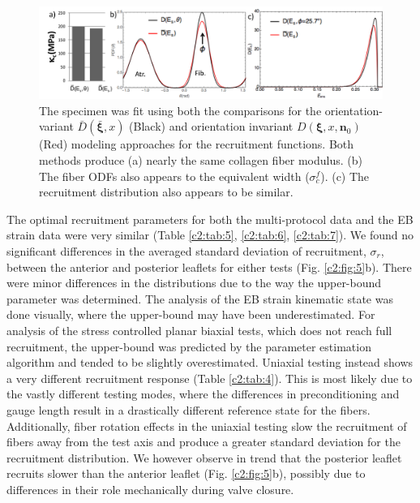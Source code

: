     
\begin{figure}
\centering
\includegraphics[width=\textwidth]{Images/chapter2/figure6.pdf}
\caption{The specimen was fit using both the comparisons for the orientation-variant $\bar{D}(\bar{\mathbf{\xi}},x)$ (Black) and orientation invariant $D(\mathbf{\xi},x,\mathbf{n}_0)$ (Red) modeling approaches for the recruitment functions. Both methods produce (a) nearly the same collagen fiber modulus. (b) The fiber ODFs also appears to the equivalent width ($\sigma_c^f$). (c) The recruitment distribution also appears to be similar.}
\label{c2:fig:6}
\end{figure}
    
    
    The optimal recruitment parameters for both the multi-protocol data and the EB strain data were very similar (Table \ref{c2:tab:5}, \ref{c2:tab:6}, \ref{c2:tab:7}). We found no significant differences in the averaged standard deviation of recruitment, $\sigma_r$, between the anterior and posterior leaflets for either tests (Fig. \ref{c2:fig:5}b). There were minor differences in the distributions due to the way the upper-bound parameter was determined. The analysis of the EB strain kinematic state was done visually, where the upper-bound may have been underestimated. For analysis of the stress controlled planar biaxial tests, which does not reach full recruitment, the upper-bound was predicted by the parameter estimation algorithm and tended to be slightly overestimated. Uniaxial testing instead shows a very different recruitment response (Table \ref{c2:tab:4}). This is most likely due to the vastly different testing modes, where the differences in preconditioning and gauge length result in a drastically different reference state for the fibers. Additionally, fiber rotation effects in the uniaxial testing slow the recruitment of fibers away from the test axis and produce a greater standard deviation for the recruitment distribution. We however observe in trend that the posterior leaflet recruits slower than the anterior leaflet (Fig. \ref{c2:fig:5}b), possibly due to differences in their role mechanically during valve closure.
    
